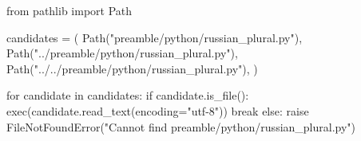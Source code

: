 
\begin{python}
from pathlib import Path

candidates = (
    Path("preamble/python/russian_plural.py"),
    Path("../preamble/python/russian_plural.py"),
    Path("../../preamble/python/russian_plural.py"),
)

for candidate in candidates:
    if candidate.is_file():
        exec(candidate.read_text(encoding="utf-8"))
        break
else:
    raise FileNotFoundError("Cannot find preamble/python/russian_plural.py")
\end{python}

\newcommand{\russianPlural}[4]{%
  \py{russian_plural_form("#1", "#2", "#3", "#4")}%
}

\newcommand{\russianTables}[1]{%
  \russianPlural{#1}{таблицу}{таблицы}{таблиц}%
}

\newcommand{\russianAppendices}[1]{%
  \russianPlural{#1}{приложение}{приложения}{приложений}%
}

\newcommand{\russianSources}[1]{%
  \russianPlural{#1}{источник}{источника}{источников}%
}

\newcommand{\russianFigures}[1]{%
  \russianPlural{#1}{рисунок}{рисунка}{рисунков}%
}

